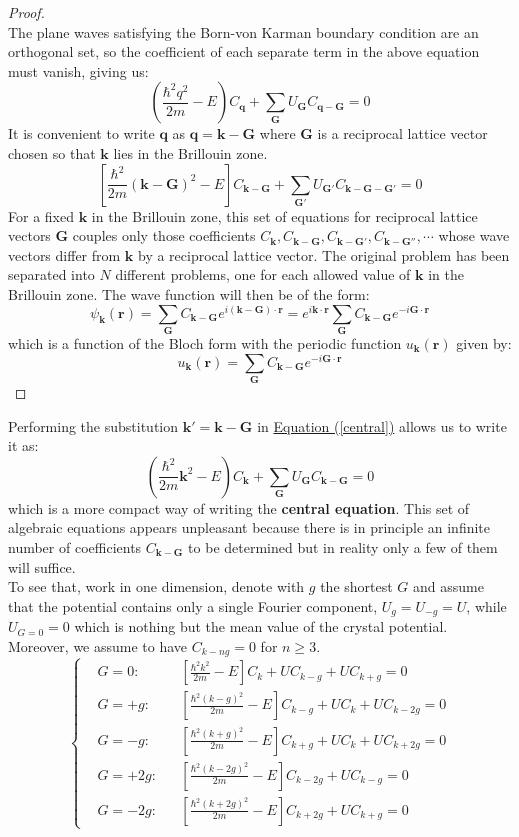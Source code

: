 \documentclass[10.75pt,a4paper,openright,bottom=2cm]{article}
\renewcommand{\Vec}[1]{\boldsymbol{#1}}
\begin{document}
\begin{proof}
\[\]
The plane waves satisfying the Born-von Karman boundary condition are an orthogonal set, so the coefficient of each separate term in the above equation must vanish, giving us:
\[
\left(\frac{\hbar^2q^2}{2m}-E\right)C_{\Vec{q}}+\sum_{\Vec{G}}U_{\Vec{G}}C_{\Vec{q}-\Vec{G}}=0
\]
It is convenient to write $\Vec{q}$ as $\Vec{q}=\Vec{k}-\Vec{G}$ where $\Vec{G}$ is a reciprocal lattice vector chosen so that $\Vec{k}$ lies in the  Brillouin zone.
\begin{equation}
\label{central}
\left[\frac{\hbar^2}{2m}(\Vec{k}-\Vec{G})^2-E\right]C_{\Vec{k}-\Vec{G}}+\sum_{\Vec{G'}}U_{\Vec{G'}}C_{\Vec{k}-\Vec{G}-\Vec{G'}}=0
\end{equation}
For a fixed $\Vec{k}$ in the  Brillouin zone, this set of equations for reciprocal lattice vectors $\Vec{G}$ couples only those coefficients $C_{\Vec{k}},C_{\Vec{k}-\Vec{G}},C_{\Vec{k}-\Vec{G'}}, C_{\Vec{k}-\Vec{G''}},\cdots$ whose wave vectors differ from $\Vec{k}$ by a reciprocal lattice vector. The original problem has been separated into $N$ different problems, one for each allowed value of $\Vec{k}$ in the  Brillouin zone. The wave function will then be of the form:
\[
\psi_{\Vec{k}}(\Vec{r})=\sum_{\Vec{G}}C_{\Vec{k}-\Vec{G}}e^{i(\Vec{k}-\Vec{G})\cdot\Vec{r}}=e^{i\Vec{k}\cdot\Vec{r}}\sum_{\Vec{G}}C_{\Vec{k}-\Vec{G}}e^{-i\Vec{G}\cdot\Vec{r}}
\]
which is a function of the Bloch form with the periodic function $u_{\Vec{k}}(\Vec{r})$ given by:
\[
u_{\Vec{k}}(\Vec{r})=\sum_{\Vec{G}}C_{\Vec{k}-\Vec{G}}e^{-i\Vec{G}\cdot\Vec{r}}
\]
\end{proof}
\noindent Performing the substitution $\Vec{k'}=\Vec{k}-\Vec{G}$ in \hyperref[central]{Equation (\ref{central})} allows us to write it as:
\[
\left(\frac{\hbar^2}{2m}\Vec{k}^2-E\right)C_{\Vec{k}}+\sum_{\Vec{G}}U_{\Vec{G}}C_{\Vec{k}-\Vec{G}}=0
\]
which is a more compact way of writing the \textbf{central equation}. This set of algebraic equations appears unpleasant because there is in principle an infinite number of coefficients $C_{\Vec{k}-\Vec{G}}$ to be determined but in reality only a few of them will suffice.\\
To see that, work in one dimension, denote with $g$ the shortest $G$ and assume that the potential contains only a single Fourier component, $U_g=U_{-g}=U$, while $U_{G=0}=0$ which is nothing but the mean value of the crystal potential. Moreover, we assume to have $C_{k-ng}=0$ for $n\ge3$.
\[
\left\{
\begin{aligned}
&G=0: &&\left[\frac{\hbar^2k^2}{2m}-E\right]C_k+UC_{k-g}+UC_{k+g}=0\\
&G=+g: &&\left[\frac{\hbar^2(k-g)^2}{2m}-E\right]C_{k-g}+UC_k+UC_{k-2g}=0\\
&G=-g: &&\left[\frac{\hbar^2(k+g)^2}{2m}-E\right]C_{k+g}+UC_k+UC_{k+2g}=0\\
&G=+2g: &&\left[\frac{\hbar^2(k-2g)^2}{2m}-E\right]C_{k-2g}+UC_{k-g}=0\\
&G=-2g: &&\left[\frac{\hbar^2(k+2g)^2}{2m}-E\right]C_{k+2g}+UC_{k+g}=0
\end{aligned}
\right.
\]
\end{document}
